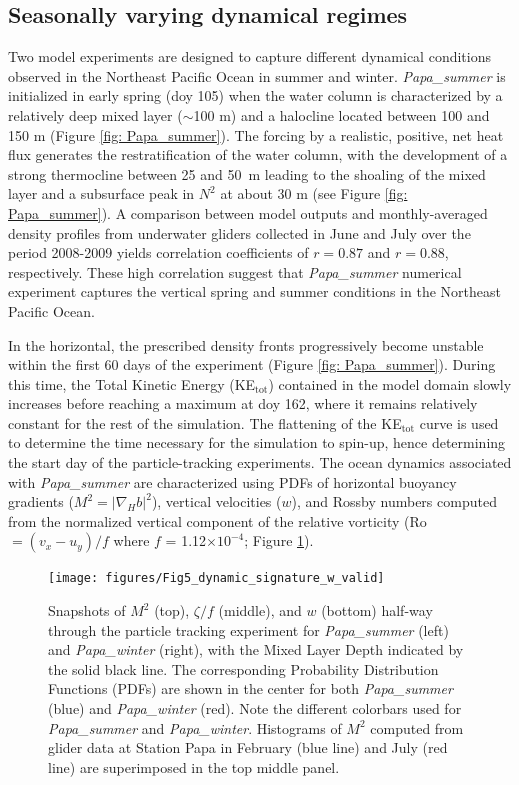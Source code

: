 \documentclass[article,linenumbers]{agujournal2018}
\begin{document}
\subsection{Seasonally varying dynamical regimes}

Two model experiments are designed to capture different dynamical conditions observed in the Northeast Pacific Ocean in summer and winter. \textit{Papa\_summer} is initialized in early spring (doy 105) when the water column is characterized by a relatively deep mixed layer ($\sim$100 m) and a halocline located between 100 and 150 m (Figure \ref{fig: Papa_summer}). The forcing by a realistic, positive, net heat flux generates the restratification of the water column, with the development of a strong thermocline between 25 and 50~m leading to the shoaling of the mixed layer and a subsurface peak in $N^2$ at about 30 m (see Figure \ref{fig: Papa_summer}). A comparison between model outputs and monthly-averaged density profiles from underwater gliders collected in June and July over the period 2008-2009 yields correlation coefficients of $r = 0.87$ and $r = 0.88$, respectively. These high correlation suggest that \textit{Papa\_summer} numerical experiment captures the vertical spring and summer conditions in the Northeast Pacific Ocean.

In the horizontal, the prescribed density fronts progressively become unstable within the first 60 days of the experiment (Figure \ref{fig: Papa_summer}). During this time, the Total Kinetic Energy (KE$_{\text{tot}}$) contained in the model domain slowly increases before reaching a maximum at doy 162, where it remains relatively constant for the rest of the simulation. The flattening of the KE$_{\text{tot}}$ curve is used to determine the time necessary for the simulation to spin-up, hence determining the start day of the particle-tracking experiments. The ocean dynamics associated with \textit{Papa\_summer} are characterized using PDFs of horizontal buoyancy gradients ($M^2 = |\nabla_Hb|^2$), vertical velocities ($w$), and Rossby numbers computed from the normalized vertical component of the relative vorticity (Ro $=(v_x - u_y)/f$ where $f$ = 1.12$\times10^{-4}$; Figure \ref{fig: dynamics}).

\begin{figure}[t]
	\centering
	\texttt{[image: figures/Fig5\_dynamic\_signature\_w\_valid]}
	\caption{Snapshots of $M^2$ (top), $\zeta /f$ (middle), and $w$ (bottom) half-way through the particle tracking experiment for \textit{Papa\_summer} (left) and \textit{Papa\_winter} (right), with the Mixed Layer Depth indicated by the solid black line. The corresponding Probability Distribution Functions (PDFs) are shown in the center for both \textit{Papa\_summer} (blue) and \textit{Papa\_winter} (red). Note the different colorbars used for \textit{Papa\_summer} and \textit{Papa\_winter}. Histograms of $M^2$ computed from glider data at Station Papa in February (blue line) and July (red line) are superimposed in the top middle panel.}
	\label{fig: dynamics}
\end{figure}
\end{document}

